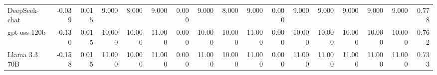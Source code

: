 \begin{landscape}
\begin{table}[htbp]
{\begin{tabular}{lrrrrrrrrrrrrrrrr}
DeepSeek-chat & -0.039 & 0.015 & 9.000 & 8.000 & 9.000 & 0.000 & 9.000 & 8.000 & 9.000 & 0.000 & 9.000 & 9.000 & 9.000 & 9.000 & 9.000 & 0.778 \\
gpt-oss-120b & -0.130 & 0.015 & 10.000 & 10.000 & 11.000 & 0.000 & 10.000 & 10.000 & 11.000 & 0.000 & 10.000 & 10.000 & 10.000 & 10.000 & 10.000 & 0.762 \\
Llama 3.3 70B & -0.158 & 0.015 & 11.000 & 10.000 & 11.000 & 0.000 & 11.000 & 10.000 & 11.000 & 0.000 & 11.000 & 11.000 & 11.000 & 11.000 & 11.000 & 0.733 \\
\bottomrule
\end{tabular}
}
\end{table}
\end{landscape}

